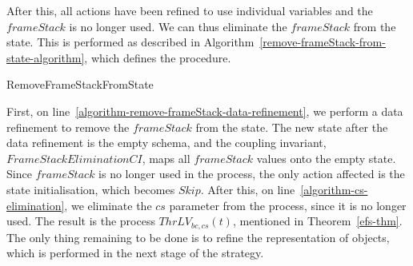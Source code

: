After this, all actions have been refined to use individual variables
and the $frameStack$ is no longer used.
We can thus eliminate the $frameStack$ from the state. 
This is performed as described in
Algorithm~\ref{remove-frameStack-from-state-algorithm}, which defines
the  procedure.

\begin{algorithm}
  \begin{algorithmic}
    \State {}
    \label{algorithm-remove-frameStack-data-refinement}
    \State {}
    \label{algorithm-cs-elimination}
  \end{algorithmic}
  \caption{RemoveFrameStackFromState}
  \label{remove-frameStack-from-state-algorithm}
\end{algorithm}

First, on line~\ref{algorithm-remove-frameStack-data-refinement}, we
perform a data refinement to remove the $frameStack$ from the state.
The new state after the data refinement is the empty schema, and the
coupling invariant, $FrameStackEliminationCI$, maps all $frameStack$
values onto the empty state.
Since $frameStack$ is no longer used in the process, the only action
affected is the state initialisation, which becomes $Skip$.
After this, on line~\ref{algorithm-cs-elimination}, we eliminate the
$cs$ parameter from the process, since it is no longer used.
The result is the process $ThrLV_{bc,cs}(t)$, mentioned in
Theorem~\ref{efs-thm}.
The only thing remaining to be done is to refine the representation of
objects, which is performed in the next stage of the strategy.